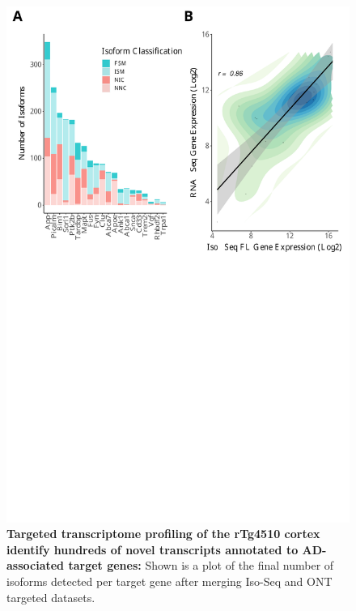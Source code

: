 \begin{figure}[]
	\centering
	\includegraphics[page=9,trim={0 26cm 0 0cm},clip,scale = 0.55]{Figures/ONTvsIsoSeq.pdf}
	\captionsetup{width=0.95\textwidth}
	\caption[Final number of isoforms identified from targeted transcriptome profiling of the rTg4510 cortex]%
	{\textbf{Targeted transcriptome profiling of the rTg4510 cortex identify hundreds of novel transcripts annotated to AD-associated target genes:} Shown is a plot of the final number of isoforms detected per target gene after merging Iso-Seq and ONT targeted datasets.}
	\label{fig:AS_targeted}
\end{figure}

